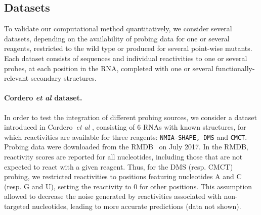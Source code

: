 \documentclass[a4,center,fleqn]{NAR}
\newcommand{\SH }{{\tt SHAPE}\xspace}
\newcommand{\etal}{~\emph{et al} }
\begin{document}



\subsection*{Datasets} 
\label{sec:datasets}
To validate our computational method quantitatively, we consider several datasets, depending on the availability of probing data for one or several reagents, restricted to the wild type or produced for several point-wise mutants. Each dataset consists of sequences and individual reactivities to one or several probes, at each position in the RNA, completed with one or several functionally-relevant secondary structures.


\paragraph{Cordero \emph{et al} dataset.} 
In order to test the integration of different probing sources, we consider a dataset introduced in Cordero\etal\cite{Cordero2012}, consisting of $6$ RNAs with known structures, for which reactivities are available for three reagents: {\tt NMIA-\SH, DMS} and {\tt CMCT}. 
Probing data were downloaded from the RMDB~\citep{Cordero2012a} on July 2017. In the RMDB, reactivity scores are reported for all nucleotides, including those that are not expected to react with a given reagent. Thus, for the DMS (resp. CMCT) probing, we restricted reactivities to positions featuring nucleotides {\sf A} and {\sf C} (resp. {\sf G} and {\sf U}), setting the reactivity to 0 for other positions. This assumption allowed to decrease the noise generated by reactivities associated with non-targeted nucleotides, leading to more accurate predictions (data not shown). 
\end{document}
